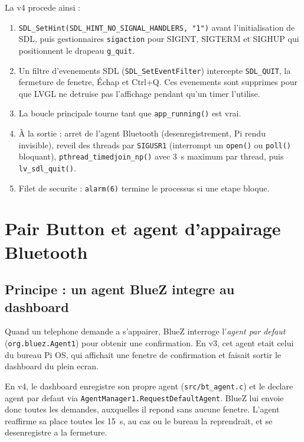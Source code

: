 \documentclass[a4paper,11pt]{article}
\begin{document}
La v4 procede ainsi :
\begin{enumerate}
  \item \texttt{SDL\_SetHint(SDL\_HINT\_NO\_SIGNAL\_HANDLERS, "1")} avant l'initialisation
    de SDL, puis gestionnaires \texttt{sigaction} pour SIGINT, SIGTERM et SIGHUP qui
    positionnent le drapeau \texttt{g\_quit}.
  \item Un filtre d'evenements SDL (\texttt{SDL\_SetEventFilter}) intercepte
    \texttt{SDL\_QUIT}, la fermeture de fenetre, Échap et Ctrl+Q. Ces evenements sont
    supprimes pour que LVGL ne detruise pas l'affichage pendant qu'un timer l'utilise.
  \item La boucle principale tourne tant que \texttt{app\_running()} est vrai.
  \item À la sortie : arret de l'agent Bluetooth (desenregistrement, Pi rendu invisible),
    reveil des threads par \texttt{SIGUSR1} (interrompt un \texttt{open()} ou \texttt{poll()}
    bloquant), \texttt{pthread\_timedjoin\_np()} avec 3~s maximum par thread, puis
    \texttt{lv\_sdl\_quit()}.
  \item Filet de securite : \texttt{alarm(6)} termine le processus si une etape bloque.
\end{enumerate}

\section{Pair Button et agent d'appairage Bluetooth}

\subsection{Principe : un agent BlueZ integre au dashboard}

Quand un telephone demande a s'appairer, BlueZ interroge l'\emph{agent par defaut}
(\texttt{org.bluez.Agent1}) pour obtenir une confirmation. En v3, cet agent etait celui
du bureau Pi OS, qui affichait une fenetre de confirmation et faisait sortir le dashboard
du plein ecran.

En v4, le dashboard enregistre son propre agent (\texttt{src/bt\_agent.c}) et le declare
agent par defaut via \texttt{AgentManager1.RequestDefaultAgent}. BlueZ lui envoie donc
toutes les demandes, auxquelles il repond sans aucune fenetre. L'agent reaffirme sa place
toutes les 15~s, au cas ou le bureau la reprendrait, et se desenregistre a la fermeture.
\end{document}
